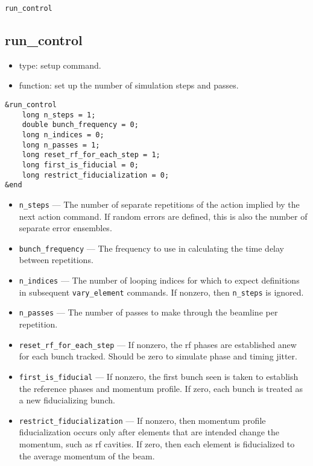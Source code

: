 \documentclass[11pt]{article}
\begin{document}
\begin{latexonly}
\newpage
\begin{center}{\Large\verb|run_control|}\end{center}
\end{latexonly}
\subsection{run\_control \label{subsec:runcontrol}}

\begin{itemize}
\item type: setup command.
\item function: set up the number of simulation steps and passes.
\end{itemize}

\begin{verbatim}
&run_control
    long n_steps = 1;
    double bunch_frequency = 0;
    long n_indices = 0;
    long n_passes = 1;
    long reset_rf_for_each_step = 1;
    long first_is_fiducial = 0;
    long restrict_fiducialization = 0;
&end
\end{verbatim}

\begin{itemize}
\item \verb|n_steps| --- The number of separate repetitions of the action implied by the next action command.
If random errors are defined, this is also the number of separate error ensembles.
\item \verb|bunch_frequency| --- The frequency to use in calculating the time delay between repetitions.
\item \verb|n_indices| --- The number of looping indices for which to expect definitions in subsequent \verb|vary_element| commands.  If nonzero, then \verb|n_steps| is ignored.
\item \verb|n_passes| --- The number of passes to make through the beamline per repetition.
\item \verb|reset_rf_for_each_step| --- If nonzero, the rf phases are 
established anew for each bunch tracked.  Should be zero to simulate
phase and timing jitter. 
\item \verb|first_is_fiducial| --- If nonzero, the first bunch seen is taken
to establish the reference phases and momentum profile.  If zero, each bunch
is treated as a new fiducializing bunch.
\item \verb|restrict_fiducialization| --- If nonzero, then  momentum profile
fiducialization occurs only after elements that are intended
change the momentum, such as rf cavities.  If zero, then each element is
fiducialized to the average momentum of the beam.
\end{itemize}
\end{document}
